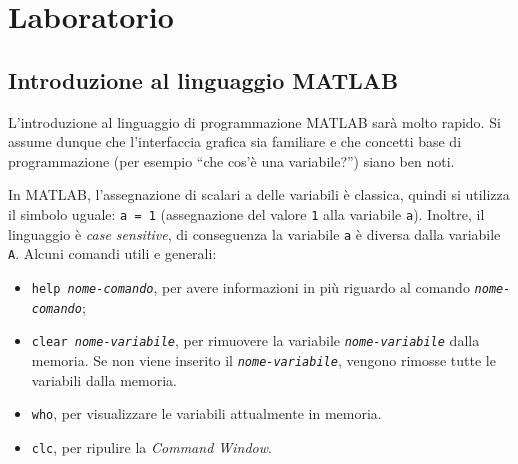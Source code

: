 \documentclass[a4paper]{article}
\newcommand{\dquotes}[1]{``#1''}
\newcommand{\highspace}{\vspace{1.2em}\noindent}
\begin{document}
    \section{Laboratorio}

    \subsection{Introduzione al linguaggio MATLAB}

    L'introduzione al linguaggio di programmazione MATLAB sarà molto rapido. Si assume dunque che l'interfaccia grafica sia familiare e che concetti base di programmazione (per esempio \dquotes{che cos'è una variabile?}) siano ben noti.

    \highspace
    In MATLAB, l'assegnazione di scalari a delle variabili è classica, quindi si utilizza il simbolo uguale: \texttt{a = 1} (assegnazione del valore \texttt{1} alla variabile \texttt{a}). Inoltre, il linguaggio è \emph{case sensitive}, di conseguenza la variabile \texttt{a} è diversa dalla variabile \texttt{A}. Alcuni comandi utili e generali:
    \begin{itemize}
        \item \texttt{help \emph{nome-comando}}, per avere informazioni in più riguardo al comando \texttt{\emph{nome-comando}};

        \item \texttt{clear \emph{nome-variabile}}, per rimuovere la variabile \texttt{\emph{nome-variabile}} dalla memoria. Se non viene inserito il \texttt{\emph{nome-variabile}}, vengono rimosse tutte le variabili dalla memoria.

        \item \texttt{who}, per visualizzare le variabili attualmente in memoria.

        \item \texttt{clc}, per ripulire la \emph{Command Window}.
    \end{itemize}
\end{document}
